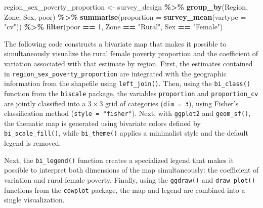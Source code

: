 \documentclass[
  english,
  12pt,
]{book}
\newenvironment{Shaded}{\begin{snugshade}}{\end{snugshade}}
\newcommand{\AttributeTok}[1]{\textcolor[rgb]{0.13,0.29,0.53}{#1}}
\newcommand{\DecValTok}[1]{\textcolor[rgb]{0.00,0.00,0.81}{#1}}
\newcommand{\FunctionTok}[1]{\textcolor[rgb]{0.13,0.29,0.53}{\textbf{#1}}}
\newcommand{\NormalTok}[1]{#1}
\newcommand{\OtherTok}[1]{\textcolor[rgb]{0.56,0.35,0.01}{#1}}
\newcommand{\SpecialCharTok}[1]{\textcolor[rgb]{0.81,0.36,0.00}{\textbf{#1}}}
\newcommand{\StringTok}[1]{\textcolor[rgb]{0.31,0.60,0.02}{#1}}
\begin{document}
\begin{Shaded}
\begin{Highlighting}[]
\NormalTok{region\_sex\_poverty\_proportion }\OtherTok{\textless{}{-}}\NormalTok{ survey\_design }\SpecialCharTok{\%\textgreater{}\%}
  \FunctionTok{group\_by}\NormalTok{(Region, Zone, Sex, poor) }\SpecialCharTok{\%\textgreater{}\%}
  \FunctionTok{summarise}\NormalTok{(}\AttributeTok{proportion =} \FunctionTok{survey\_mean}\NormalTok{(}\AttributeTok{vartype =} \StringTok{"cv"}\NormalTok{)) }\SpecialCharTok{\%\textgreater{}\%}
  \FunctionTok{filter}\NormalTok{(poor }\SpecialCharTok{==} \DecValTok{1}\NormalTok{, Zone }\SpecialCharTok{==} \StringTok{"Rural"}\NormalTok{, Sex }\SpecialCharTok{==} \StringTok{"Female"}\NormalTok{)}
\end{Highlighting}
\end{Shaded}

The following code constructs a bivariate map that makes it possible to simultaneously visualize the rural female poverty proportion and the coefficient of variation associated with that estimate by region. First, the estimates contained in \texttt{region\_sex\_poverty\_proportion} are integrated with the geographic information from the shapefile using \texttt{left\_join()}. Then, using the \texttt{bi\_class()} function from the \texttt{biscale} package, the variables \texttt{proportion} and \texttt{proportion\_cv} are jointly classified into a \(3 \times 3\) grid of categories (\texttt{dim\ =\ 3}), using Fisher's classification method (\texttt{style\ =\ "fisher"}). Next, with \texttt{ggplot2} and \texttt{geom\_sf()}, the thematic map is generated using bivariate colors defined by \texttt{bi\_scale\_fill()}, while \texttt{bi\_theme()} applies a minimalist style and the default legend is removed.

Next, the \texttt{bi\_legend()} function creates a specialized legend that makes it possible to interpret both dimensions of the map simultaneously: the coefficient of variation and rural female poverty. Finally, using the \texttt{ggdraw()} and \texttt{draw\_plot()} functions from the \texttt{cowplot} package, the map and legend are combined into a single visualization.
\end{document}
